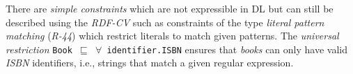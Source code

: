 \documentclass[a4paper,fontsize=11pt]{scrartcl}
\newcommand{\tb}[1]{\todo[size=\small, color=green!40]{\textbf{Thomas:} #1}}
\newcommand{\ms}[1]{\texttt{#1}}
\begin{document}
There are \emph{simple constraints} which are not expressible in DL but can still be described using the \emph{RDF-CV} 
such as constraints of the type \emph{literal pattern matching} (\emph{R-44}) which restrict literals to match given patterns.
The \emph{universal restriction} {\small\ms{Book $\sqsubseteq$ $\forall$ identifier.ISBN}} ensures that \emph{books} can only have valid \emph{ISBN} identifiers, 
i.e., strings that match a given regular expression.
%
\end{document}
